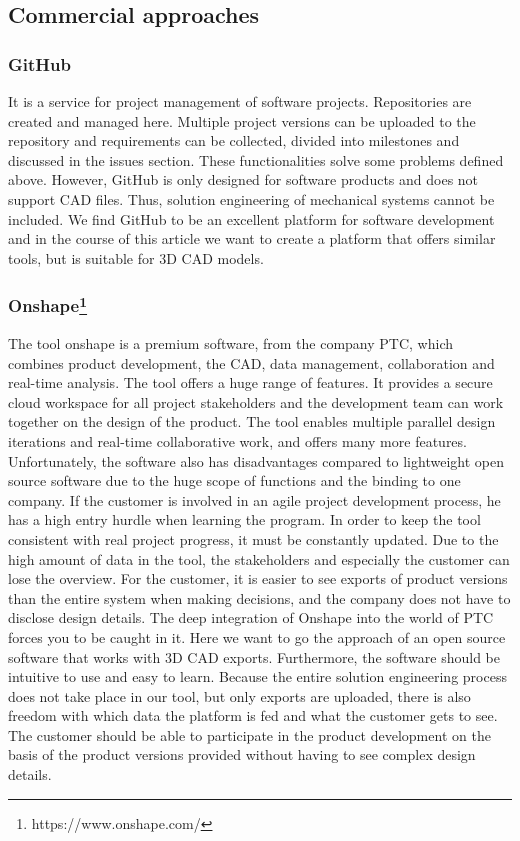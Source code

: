     \subsection*{Commercial approaches}
    \subsubsection*{GitHub}
    It is a service for project management of software projects. Repositories are created and managed here. Multiple project versions can be uploaded to the repository and requirements can be collected, divided into milestones and discussed in the issues section. These functionalities solve some problems defined above. However, GitHub is only designed for software products and does not support CAD files. Thus, solution engineering of mechanical systems cannot be included. We find GitHub to be an excellent platform for software development and in the course of this article we want to create a platform that offers similar tools, but is suitable for 3D CAD models.

    \subsubsection*{Onshape\footnote{https://www.onshape.com/}}
    The tool onshape is a premium software, from the company PTC, which combines product development, the CAD, data management, collaboration and real-time analysis. The tool offers a huge range of features. It provides a secure cloud workspace for all project stakeholders and the development team can work together on the design of the product. The tool enables multiple parallel design iterations and real-time collaborative work, and offers many more features. 
    Unfortunately, the software also has disadvantages compared to lightweight open source software due to the huge scope of functions and the binding to one company. If the customer is involved in an agile project development process, he has a high entry hurdle when learning the program.  In order to keep the tool consistent with real project progress, it must be constantly updated. Due to the high amount of data in the tool, the stakeholders and especially the customer can lose the overview. For the customer, it is easier to see exports of product versions than the entire system when making decisions, and the company does not have to disclose design details. The deep integration of Onshape into the world of PTC forces you to be caught in it. 
    Here we want to go the approach of an open source software that works with 3D CAD exports. Furthermore, the software should be intuitive to use and easy to learn. Because the entire solution engineering process does not take place in our tool, but only exports are uploaded, there is also freedom with which data the platform is fed and what the customer gets to see. The customer should be able to participate in the product development on the basis of the product versions provided without having to see complex design details.

